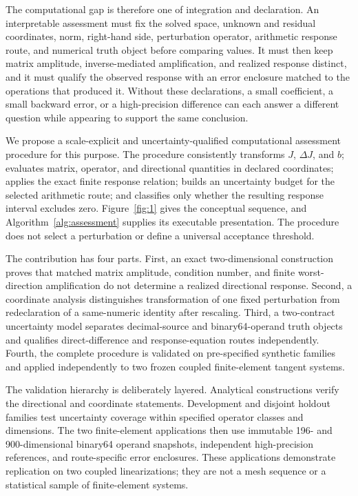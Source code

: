 \documentclass[preprint,12pt]{elsarticle}
\begin{document}
The computational gap is therefore one of integration and declaration. An interpretable assessment must fix the solved space, unknown and residual coordinates, norm, right-hand side, perturbation operator, arithmetic response route, and numerical truth object before comparing values. It must then keep matrix amplitude, inverse-mediated amplification, and realized response distinct, and it must qualify the observed response with an error enclosure matched to the operations that produced it. Without these declarations, a small coefficient, a small backward error, or a high-precision difference can each answer a different question while appearing to support the same conclusion.

We propose a scale-explicit and uncertainty-qualified computational assessment procedure for this purpose. The procedure consistently transforms $J$, $\Delta J$, and $b$; evaluates matrix, operator, and directional quantities in declared coordinates; applies the exact finite response relation; builds an uncertainty budget for the selected arithmetic route; and classifies only whether the resulting response interval excludes zero. Figure~\ref{fig:1} gives the conceptual sequence, and Algorithm~\ref{alg:assessment} supplies its executable presentation. The procedure does not select a perturbation or define a universal acceptance threshold.

The contribution has four parts. First, an exact two-dimensional construction proves that matched matrix amplitude, condition number, and finite worst-direction amplification do not determine a realized directional response. Second, a coordinate analysis distinguishes transformation of one fixed perturbation from redeclaration of a same-numeric identity after rescaling. Third, a two-contract uncertainty model separates decimal-source and binary64-operand truth objects and qualifies direct-difference and response-equation routes independently. Fourth, the complete procedure is validated on pre-specified synthetic families and applied independently to two frozen coupled finite-element tangent systems.

The validation hierarchy is deliberately layered. Analytical constructions verify the directional and coordinate statements. Development and disjoint holdout families test uncertainty coverage within specified operator classes and dimensions. The two finite-element applications then use immutable 196- and 900-dimensional binary64 operand snapshots, independent high-precision references, and route-specific error enclosures. These applications demonstrate replication on two coupled linearizations; they are not a mesh sequence or a statistical sample of finite-element systems.
\end{document}
